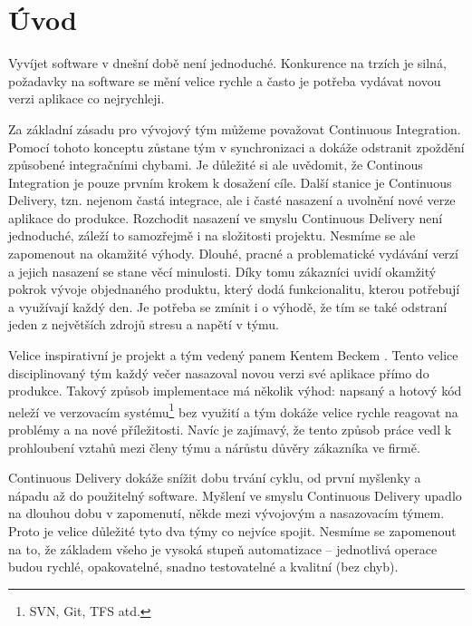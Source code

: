 
\chapter{Úvod}
Vyvíjet software v dnešní době není jednoduché. Konkurence na trzích je silná, požadavky na software se mění velice rychle a často je potřeba vydávat novou verzi aplikace co nejrychleji.

Za základní zásadu pro vývojový tým můžeme považovat Continuous Integration. Pomocí tohoto konceptu zůstane tým v synchronizaci a dokáže odstranit zpoždění způsobené integračními chybami. Je důležité si ale uvědomit, že Continous Integration je pouze prvním krokem k dosažení cíle. Další stanice je Continuous Delivery, tzn. nejenom častá integrace, ale i časté nasazení a uvolnění nové verze aplikace do produkce. Rozchodit nasazení ve smyslu Continuous Delivery není jednoduché, záleží to samozřejmě i na složitosti projektu. Nesmíme se ale zapomenout na okamžité výhody. Dlouhé, pracné a problematické vydávání verzí a jejich nasazení se stane věcí minulosti. Díky tomu zákazníci uvidí okamžitý pokrok vývoje objednaného produktu, který dodá funkcionalitu, kterou potřebují a využívají každý den. Je potřeba se zmínit i o výhodě, že tím se také odstraní jeden z největších zdrojů stresu a napětí v týmu.

Velice inspirativní je projekt a tým vedený panem Kentem Beckem \cite{ContDelivery}. Tento velice disciplinovaný tým každý večer nasazoval novou verzi své aplikace přímo do produkce. Takový způsob implementace má několik výhod: napsaný a hotový kód neleží ve verzovacím systému\footnote{SVN, Git, TFS atd.} bez využití a tým dokáže velice rychle reagovat na problémy a na nové příležitosti. Navíc je zajímavý, že tento způsob práce vedl k prohloubení vztahů mezi členy týmu a nárůstu důvěry zákazníka ve firmě. 

Continuous Delivery dokáže snížit dobu trvání cyklu, od první myšlenky a nápadu až do použitelný software. Myšlení ve smyslu Continuous Delivery upadlo na dlouhou dobu v zapomenutí, někde mezi vývojovým a nasazovacím týmem. Proto je velice důležité tyto dva týmy co nejvíce spojit. Nesmíme se zapomenout na to, že základem všeho je vysoká stupeň automatizace -- jednotlivá operace budou rychlé, opakovatelné, snadno testovatelné a kvalitní (bez chyb).

